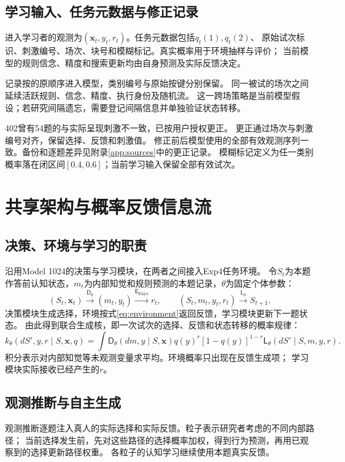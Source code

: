 \documentclass[11pt,a4paper]{article}
\numberwithin{equation}{section}
\begin{document}
\subsection{学习输入、任务元数据与修正记录}
进入学习者的观测为$(\bm x_t,y_t,r_t)$。任务元数据包括$q_t(1),q_t(2)$、
原始试次标识、刺激编号、场次、块号和模糊标记。真实概率用于环境抽样与评价；
当前模型的规则信念、精度和搜索更新均由自身预测及实际反馈决定。

记录按的原顺序进入模型，类别编号与原始按键分别保留。
同一被试的场次之间延续活跃规则、信念、精度、执行身份及随机流。
这一跨场策略是当前模型假设；若研究间隔遗忘，需要登记间隔信息并单独验证状态转移。

402曾有54题的与实际呈现刺激不一致，已按用户授权更正。
更正通过场次与刺激编号对齐，保留选择、反馈和刺激值。
修正前后模型使用的全部有效观测序列一致。备份和逐题差异见附录\ref{app:sources}中的更正记录。
模糊标记定义为任一类别概率落在闭区间$[0.4,0.6]$；当前学习输入保留全部有效试次。

\section{共享架构与概率反馈信息流}
\label{sec:architecture}

\subsection{决策、环境与学习的职责}
沿用Model 1024的决策与学习模块，在两者之间接入Exp4任务环境。
令$S_t$为本题作答前认知状态，$m_t$为内部知觉和规则预测的本题记录，$\theta$为固定个体参数：
\begin{equation}
(S_t,\bm x_t)\xrightarrow{\mathsf D_\theta}(m_t,y_t)
\xrightarrow{\mathsf E_{\mathrm{Exp4}}}r_t,
\qquad
(S_t,m_t,y_t,r_t)\xrightarrow{\mathsf L_\theta}S_{t+1}.
\label{eq:closed-loop}
\end{equation}
决策模块生成选择，环境按式\eqref{eq:environment}返回反馈，学习模块更新下一题状态。
由此得到联合生成核，即一次试次的选择、反馈和状态转移的概率规律：
\begin{equation}
k_\theta(dS',y,r\mid S,\bm x,q)=
\int\mathsf D_\theta(dm,y\mid S,\bm x)
q(y)^r[1-q(y)]^{1-r}
\mathsf L_\theta(dS'\mid S,m,y,r).
\label{eq:kernel}
\end{equation}
积分表示对内部知觉等未观测变量求平均。环境概率只出现在反馈生成项；
学习模块实际接收已经产生的$r$。

\subsection{观测推断与自主生成}
观测推断逐题注入真人的实际选择和实际反馈。粒子表示研究者考虑的不同内部路径；
当前选择发生前，先对这些路径的选择概率加权，得到行为预测，再用已观察到的选择更新路径权重。
各粒子的认知学习继续使用本题真实反馈。
\end{document}
